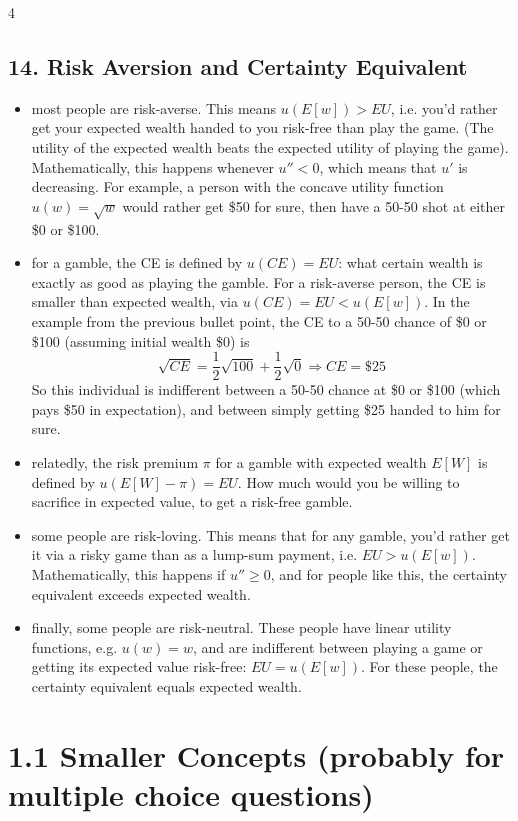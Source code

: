 \documentclass[8pt,landscape]{extarticle}
\begin{document}
\begin{multicols}{4}
\subsection*{14. Risk Aversion and Certainty Equivalent}
\begin{itemize}[leftmargin=*,noitemsep,topsep=0pt]
\item most people are risk-averse. This means $u(E[w]) > EU$, i.e. you'd rather get your expected wealth handed to you risk-free than play the game. (The utility of the expected wealth beats the expected utility of playing the game). Mathematically, this happens whenever $u'' < 0$, which means that $u'$ is decreasing. For example, a person with the concave utility function $u(w) = \sqrt{w}$ would rather get \$50 for sure, then have a 50-50 shot at either \$0 or \$100.
\item for a gamble, the CE is defined by $u(CE) = EU$: what certain wealth is exactly as good as playing the gamble. For a risk-averse person, the CE is smaller than expected wealth, via $u(CE) = EU < u(E[w])$. In the example from the previous bullet point, the CE to a 50-50 chance of \$0 or \$100 (assuming initial wealth \$0) is
$$\sqrt{CE} = \frac{1}{2}\sqrt{100} + \frac{1}{2}\sqrt{0} \Rightarrow CE = \$25$$
So this individual is indifferent between a 50-50 chance at \$0 or \$100 (which pays \$50 in expectation), and between simply getting \$25 handed to him for sure.
\item relatedly, the risk premium $\pi$ for a gamble with expected wealth $E[W]$ is defined by $u(E[W] - \pi) = EU$. How much would you be willing to sacrifice in expected value, to get a risk-free gamble.
\item some people are risk-loving. This means that for any gamble, you'd rather get it via a risky game than as a lump-sum payment, i.e. $EU > u(E[w])$. Mathematically, this happens if $u'' \geq 0$, and for people like this, the certainty equivalent exceeds expected wealth.
\item finally, some people are risk-neutral. These people have linear utility functions, e.g. $u(w) = w$, and are indifferent between playing a game or getting its expected value risk-free: $EU = u(E[w])$. For these people, the certainty equivalent equals expected wealth.
\end{itemize}

\section*{1.1 Smaller Concepts (probably for multiple choice questions)}


\end{multicols}
\end{document}
